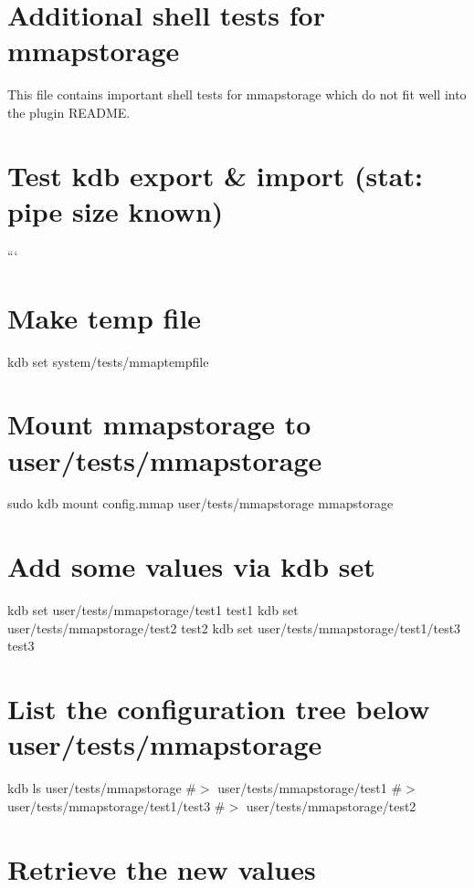 \hypertarget{md_src_plugins_mmapstorage_shelltests_src_plugins_mmapstorage_shelltests_md}{}\section{Additional shell tests for mmapstorage}\label{md_src_plugins_mmapstorage_shelltests_src_plugins_mmapstorage_shelltests_md}
This file contains important shell tests for mmapstorage which do not fit well into the plugin R\+E\+A\+D\+ME.

\section*{Test kdb export \& import (stat\+: pipe size known)}

``` \section*{Make temp file}

kdb set system/tests/mmaptempfile 

\section*{Mount mmapstorage to {\ttfamily user/tests/mmapstorage}}

sudo kdb mount config.\+mmap user/tests/mmapstorage mmapstorage

\section*{Add some values via {\ttfamily kdb set}}

kdb set user/tests/mmapstorage/test1 test1 kdb set user/tests/mmapstorage/test2 test2 kdb set user/tests/mmapstorage/test1/test3 test3

\section*{List the configuration tree below {\ttfamily user/tests/mmapstorage}}

kdb ls user/tests/mmapstorage \#$>$ user/tests/mmapstorage/test1 \#$>$ user/tests/mmapstorage/test1/test3 \#$>$ user/tests/mmapstorage/test2

\section*{Retrieve the new values}


